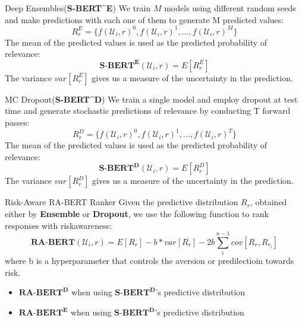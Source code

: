 \documentclass{beamer}
\begin{document}
\begin{frame}{Deep Ensembles(\textbf{S-BERT}^{\textbf{E}})}
We train $M$ models using different random seeds and make predictions with each one of them to generate M predicted values:
\begin{equation}
    R^{E}_{r} = \{ f(\mathcal{U}_i, r)^0, f(\mathcal{U}_i, r)^1, ..., f(\mathcal{U}_i, r)^M \}
\end{equation}
The mean of the predicted values is used as the predicted probability of relevance:
\begin{equation}
    \textbf{S-BERT}^{\textbf{E}}(\mathcal{U}_i, r) = E[R^E_r]
\end{equation}
The variance $var[R^E_r]$ gives us a measure of the uncertainty in the prediction.
\end{frame}

\begin{frame}{MC Dropout(\textbf{S-BERT}^{\textbf{D}})}
We train a single model and employ dropout at test time and generate stochastic predictions of relevance by conducting T forward passes:
\begin{equation}
    R^{D}_{r} = \{ f(\mathcal{U}_i, r)^0, f(\mathcal{U}_i, r)^1, ..., f(\mathcal{U}_i, r)^T \}
\end{equation}
The mean of the predicted values is used as the predicted probability of relevance:
\begin{equation}
    \textbf{S-BERT}^{\textbf{D}}(\mathcal{U}_i, r) = E[R^D_r]
\end{equation}
The variance $var[R^D_r]$ gives us a measure of the uncertainty in the prediction.

\end{frame}

\begin{frame}{Risk-Aware RA-BERT Ranker}
    Given the predictive distribution $R_r$, obtained either by \textbf{Ensemble} or \textbf{Dropout}, we use the following function to rank responses with riskawareness:
    \begin{equation}
        \textbf{RA-BERT}(\mathcal{U}_i, r) = E[R_r] - b * var[R_r] - 2b\sum_i^{n-1}cov[R_r, R_{r_i}]
    \end{equation}
    where b is a hyperparameter that controls the aversion or predilectioin towards risk.
    
    \begin{itemize}
        \item $\textbf{RA-BERT}^\textbf{D} $ when using $\textbf{S-BERT}^\textbf{D}$'s predictive distribution
        \item $\textbf{RA-BERT}^\textbf{E} $ when using $\textbf{S-BERT}^\textbf{D}$'s predictive distribution
    \end{itemize}
\end{frame}
\end{document}
